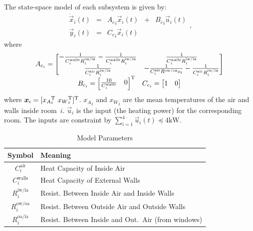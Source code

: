 \documentclass[../main.tex]{subfiles}
\begin{document}
The state-space model of each subsystem is given by:
\begin{equation}
  \begin{matrix}
    \label{eq:systems_cont}
    \dot{\vec{x}}_{i}(t)  &=&{A_{c}}_{i}\vec{x}_{i}(t) &+& {B_{c}}_{i}\vec{u}_{i}(t)\\
    \vec{y}_{i}(t)        &=&{C_{c}}_{i}\vec{x}_{i}(t) &&
  \end{matrix},
\end{equation}
where
\begin{equation}
  \label{eq:4}
  \begin{matrix}
    A_{\mathrm{c}_{i}}=\left[
    \begin{matrix}
      -\frac{1}{C^{\text{walls}}_{i}R^{\text{oa/ia}}_{i}}-\frac{1}{C^{\text{walls}}_{i}R^{\text{iw/ia}}_{i}}& \frac{1}{C^{\text{walls}}_{i}R^{\text{iw/ia}}_{i}}\\
      \frac{1}{C^{\text{air}}_{i}R^{\text{iw/ia}}_{i}} &-\frac{1}{C^{\text{air}}_{i}R^{\text{ow/oa}}o_{i}}-\frac{1}{C^{\text{air}}_{i}R^{\text{iw/ia}}_{i}}
    \end{matrix}\right]\\
    \begin{matrix}
      B_{\mathrm{c}_{i}}=\left[
      \begin{matrix}  \frac{10}{C^{\text{walls}}_{i}}& 0\end{matrix}
                                                       \right]^{\mathrm{T}}&C_{\mathrm{c}_{i}}=\left[\begin{matrix}1 & 0\end{matrix}\right]
    \end{matrix}
  \end{matrix}
\end{equation}
where ${\vec{x}_{i}=[{{x}_{A}}_{i}\T\ {{x}_{W}}_{i}\T]\T}$. ${x_A}_i$ and ${x_W}_i$ are the mean temperatures of the air and walls inside room~$i$. $\vec{u}_{i}$ is the input (the heating power)
for the corresponding room. The inputs are constraint by ${\sum_{i=1}^{4}\vec{u}_{i}(t)\preceq 4\mathrm{kW}}$.

\begin{table}[b]
  \centering
  \caption{Model Parameters}\label{tab:modelParamMeaning}
  \begin{tabular}[b]{cl}
    \toprule
    Symbol&Meaning\\
    \midrule
    $C^{\text{air}}_{i}$  &Heat Capacity of Inside Air\\
    $C^{\text{walls}}_{i}$ &Heat Capacity of External Walls\\
    $R^{\text{iw/ia}}_{i}$ &Resist. Between Inside Air and Inside Walls\\
    $R^{\text{ow/oa}}_{i}$ &Resist. Between Outside Air and Outside Walls\\
    $R^{\text{oa/ia}}_{i}$ &Resist. Between Inside and Out.\ Air (from windows)\\
    \bottomrule
  \end{tabular}
\end{table}
\end{document}

